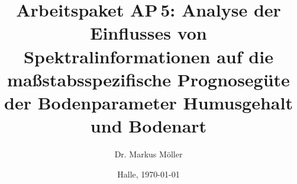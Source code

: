 \documentclass[11pt,
			oneside,
			noonlinecaption]{scrartcl}
\title{Arbeitspaket AP\,5: Analyse der Einflusses von Spektralinformationen auf die
maßstabsspezifische Prognosegüte der Bodenparameter Humusgehalt und Bodenart}
\author{Dr. Markus Möller}
\date{\footnotesize Halle, \today}
\begin{document}
\tracingall
%


\end{document}
